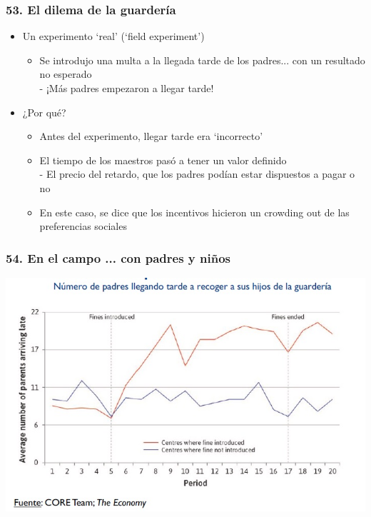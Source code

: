 \documentclass[14pt]{beamer}
\begin{document}
\begin{frame}
\frametitle{53. El dilema de la guardería}
\begin{itemize}
    \item Un experimento `real' (`field experiment')
       \begin{itemize}
       \item Se introdujo una multa a la llegada tarde de los padres... con un resultado no esperado \\
        - ¡Más padres empezaron a llegar tarde!
        \end{itemize}
    \item ¿Por qué?
        \begin{itemize}
        \item Antes del experimento, llegar tarde era `incorrecto' 
        \item El tiempo de los maestros pasó a tener un valor definido \\
        - El precio del retardo, que los padres podían estar dispuestos a pagar o no \\ 
        \item En este caso, se dice que los incentivos hicieron un crowding out de las preferencias sociales
    \end{itemize}
\end{itemize}
\end{frame}

\begin{frame}
\frametitle{54. En el campo ... con padres y niños}
\centering
\includegraphics[scale=0.6]{Figures/Tema_03_28_guarderia.jpg}
\end{frame}
\end{document}
